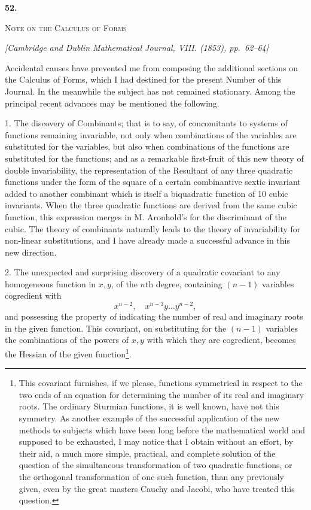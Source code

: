 \documentclass[11pt]{article}
\newcommand{\paperhead}[3]{%
  \clearpage
  \begin{center}
  {\Large\bfseries #1.}\par\vspace{0.85em}
  {\large\scshape #2}\par\vspace{0.6em}
  {\itshape [#3]}\par
  \end{center}\vspace{0.4em}}
\newcommand{\sourcepage}[1]{\marginpar{\scriptsize p.~#1}}
\begin{document}
{{\paperhead{52}{Note on the Calculus of Forms}{Cambridge and Dublin Mathematical Journal, VIII. (1853), pp.~62--64}

\sourcepage{402}
Accidental causes have prevented me from composing the additional sections on the Calculus of Forms, which I had destined for the present Number of this Journal. In the meanwhile the subject has not remained stationary. Among the principal recent advances may be mentioned the following.

1. The discovery of Combinants; that is to say, of concomitants to systems of functions remaining invariable, not only when combinations of the variables are substituted for the variables, but also when combinations of the functions are substituted for the functions; and as a remarkable first-fruit of this new theory of double invariability, the representation of the Resultant of any three quadratic functions under the form of the square of a certain combinantive sextic invariant added to another combinant which is itself a biquadratic function of 10 cubic invariants. When the three quadratic functions are derived from the same cubic function, this expression merges in M. Aronhold's for the discriminant of the cubic. The theory of combinants naturally leads to the theory of invariability for non-linear substitutions, and I have already made a successful advance in this new direction.

2. The unexpected and surprising discovery of a quadratic covariant to any homogeneous function in $x,y$, of the $n$th degree, containing $(n-1)$ variables cogredient with
\[
x^{n-2},\quad x^{n-3}y\ldots y^{n-2},
\]
and possessing the property of indicating the number of real and imaginary roots in the given function. This covariant, on substituting for the $(n-1)$ variables the combinations of the powers of $x,y$ with which they are cogredient, becomes the Hessian of the given function\footnote{This covariant furnishes, if we please, functions symmetrical in respect to the two ends of an equation for determining the number of its real and imaginary roots. The ordinary Sturmian functions, it is well known, have not this symmetry. As another example of the successful application of the new methods to subjects which have been long before the mathematical world and supposed to be exhausted, I may notice that I obtain without an effort, by their aid, a much more simple, practical, and complete solution of the question of the simultaneous transformation of two quadratic functions, or the orthogonal transformation of one such function, than any previously given, even by the great masters Cauchy and Jacobi, who have treated this question.}.

}}
\end{document}
